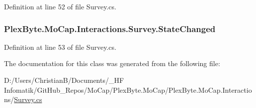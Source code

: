 Definition at line 52 of file Survey.\+cs.

\subsubsection[{\texorpdfstring{State\+Changed}{StateChanged}}]{ Plex\+Byte.\+Mo\+Cap.\+Interactions.\+Survey.\+State\+Changed}\hypertarget{class_plex_byte_1_1_mo_cap_1_1_interactions_1_1_survey_afaec6df3811245396b6f4bfc3062a0c9}{}\label{class_plex_byte_1_1_mo_cap_1_1_interactions_1_1_survey_afaec6df3811245396b6f4bfc3062a0c9}


Definition at line 53 of file Survey.\+cs.



The documentation for this class was generated from the following file\+:\begin{DoxyCompactItemize}
\item 
D\+:/\+Users/\+Christian\+B/\+Documents/\+\_\+\+H\+F Infomatik/\+Git\+Hub\+\_\+\+Repos/\+Mo\+Cap/\+Plex\+Byte.\+Mo\+Cap/\+Plex\+Byte.\+Mo\+Cap.\+Interactions/\hyperlink{_survey_8cs}{Survey.\+cs}\end{DoxyCompactItemize}
